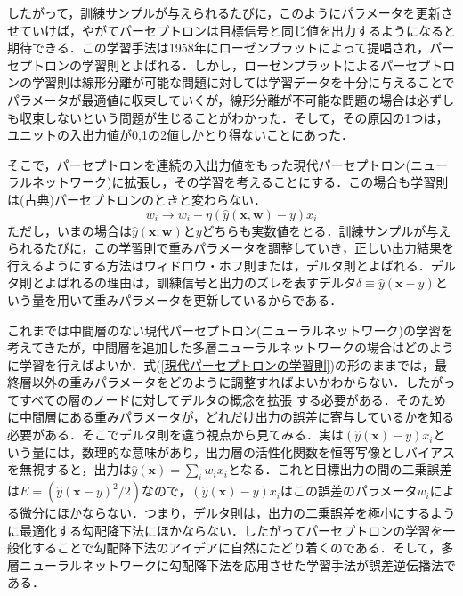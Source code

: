 \documentclass[a4paper,11pt]{jsreport}
\begin{document}
したがって，訓練サンプルが与えられるたびに，このようにパラメータを更新させていけば，やがてパーセプトロンは目標信号と同じ値を出力するようになると期待できる．この学習手法は1958年にローゼンプラットによって提唱され，パーセプトロンの学習則とよばれる．しかし，ローゼンプラットによるパーセプトロンの学習則は線形分離が可能な問題に対しては学習データを十分に与えることでパラメータが最適値に収束していくが，線形分離が不可能な問題の場合は必ずしも収束しないという問題が生じることがわかった．そして，その原因の1つは，ユニットの入出力値が0,1の2値しかとり得ないことにあった．\par
そこで，パーセプトロンを連続の入出力値をもった現代パーセプトロン(ニューラルネットワーク)に拡張し，その学習を考えることにする．この場合も学習則は(古典)パーセプトロンのときと変わらない．
\begin{equation}
  w_i \rightarrow w_i - \eta (\hat{y}(\bm{x},\bm{w}) - y) x_i \label{現代パーセプトロンの学習則}
\end{equation}
ただし，いまの場合は$\hat{y}(\bm{x};\bm{w})$と$y$どちらも実数値をとる．訓練サンプルが与えられるたびに，この学習則で重みパラメータを調整していき，正しい出力結果を行えるようにする方法はウィドロウ・ホフ則または，デルタ則とよばれる．デルタ則とよばれるの理由は，訓練信号と出力のズレを表すデルタ$\delta \equiv \hat{y}(\bm{x}-y)$という量を用いて重みパラメータを更新しているからである．\par
これまでは中間層のない現代パーセプトロン(ニューラルネットワーク)の学習を考えてきたが，中間層を追加した多層ニューラルネットワークの場合はどのように学習を行えばよいか．式(\ref{現代パーセプトロンの学習則})の形のままでは，最終層以外の重みパラメータをどのように調整すればよいかわからない．したがってすべての層のノードに対してデルタの概念を拡張
する必要がある．そのために中間層にある重みパラメータが，どれだけ出力の誤差に寄与しているかを知る必要がある．そこでデルタ則を違う視点から見てみる．実は$(\hat{y}(\bm{x})-y)x_i$という量には，数理的な意味があり，出力層の活性化関数を恒等写像としバイアスを無視すると，出力は$\hat{y}(\bm{x})=\sum_i w_i x_i$となる．これと目標出力の間の二乗誤差は$E=(\hat{y}(\bm{x}-y)^2/2)$なので，$(\hat{y}(\bm{x})-y)x_i$はこの誤差のパラメータ$w_i$による微分にほかならない．つまり，デルタ則は，出力の二乗誤差を極小にするように最適化する勾配降下法にほかならない．したがってパーセプトロンの学習を一般化することで勾配降下法のアイデアに自然にたどり着くのである．そして，多層ニューラルネットワークに勾配降下法を応用させた学習手法が誤差逆伝播法である．
\end{document}
